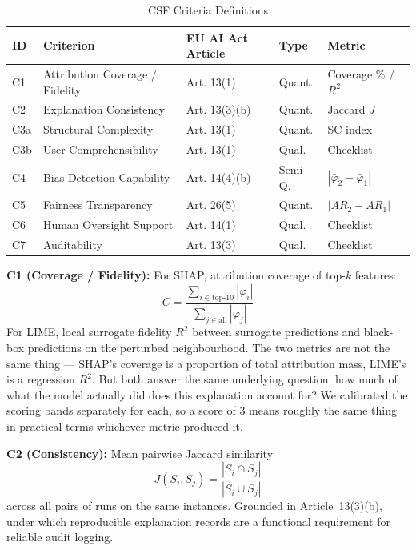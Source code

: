 \documentclass[conference]{IEEEtran}
\begin{document}
\begin{table}[h]
\caption{CSF Criteria Definitions}
\label{tab:csf_criteria}
\centering
\renewcommand{\arraystretch}{1.2}
\begin{tabular}{p{0.28cm}p{2.0cm}p{1.4cm}p{0.7cm}p{1.5cm}}
\toprule
\textbf{ID} & \textbf{Criterion} & \textbf{EU AI Act Article} & \textbf{Type} & \textbf{Metric} \\
\midrule
C1  & Attribution Coverage / Fidelity     & Art. 13(1)   & Quant.  & Coverage \% / $R^2$ \\
C2  & Explanation Consistency             & Art. 13(3)(b)& Quant.  & Jaccard $J$ \\
C3a & Structural Complexity               & Art. 13(1)   & Quant.  & SC index \\
C3b & User Comprehensibility              & Art. 13(1)   & Qual.   & Checklist \\
C4  & Bias Detection Capability           & Art. 14(4)(b)& Semi-Q. & $|\bar{\varphi}_2 - \bar{\varphi}_1|$ \\
C5  & Fairness Transparency               & Art. 26(5)   & Quant.  & $|AR_2 - AR_1|$ \\
C6  & Human Oversight Support             & Art. 14(1)   & Qual.   & Checklist \\
C7  & Auditability                        & Art. 13(3)   & Qual.   & Checklist \\
\bottomrule
\end{tabular}
\end{table}

\noindent\textbf{C1 (Coverage / Fidelity):} For SHAP, attribution coverage of top-$k$ features:
\begin{equation}
    C = \frac{\sum_{i \in \text{top-10}} |\varphi_i|}{\sum_{j \in \text{all}} |\varphi_j|}
\end{equation}
For LIME, local surrogate fidelity $R^2$ between surrogate predictions and black-box predictions on the perturbed neighbourhood. The two metrics are not the same thing --- SHAP's coverage is a proportion of total attribution mass, LIME's is a regression $R^2$. But both answer the same underlying question: how much of what the model actually did does this explanation account for? We calibrated the scoring bands separately for each, so a score of 3 means roughly the same thing in practical terms whichever metric produced it.
\smallskip

\noindent\textbf{C2 (Consistency):} Mean pairwise Jaccard similarity
\begin{equation}
    J(S_i, S_j) = \frac{|S_i \cap S_j|}{|S_i \cup S_j|}
\end{equation}
 across all pairs of runs on the same instances. Grounded in
Article~13(3)(b), under which reproducible explanation records
are a functional requirement for reliable audit logging.
\smallskip
\end{document}
